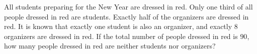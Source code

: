 All students preparing for the New Year are dressed in red. Only one third of all people dressed in red are students. Exactly half of the organizers are dressed in red. It is known that exactly one student is also an organizer, and exactly $8$ organizers are dressed in red. If the total number of people dressed in red is $90$, how many people dressed in red are neither students nor organizers?
